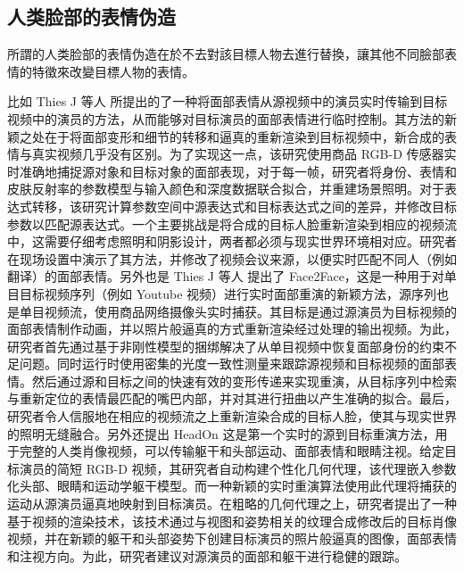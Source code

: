 \subsection{人类脸部的表情伪造}

所謂的人类脸部的表情伪造在於不去對該目標人物去進行替換，讓其他不同臉部表情的特徵來改變目標人物的表情。

比如 Thies J 等人 \cite{thies2015real} 所提出的了一种将面部表情从源视频中的演员实时传输到目标视频中的演员的方法，从而能够对目标演员的面部表情进行临时控制。其方法的新颖之处在于将面部变形和细节的转移和逼真的重新渲染到目标视频中，新合成的表情与真实视频几乎没有区别。为了实现这一点，该研究使用商品 RGB-D 传感器实时准确地捕捉源对象和目标对象的面部表现，对于每一帧，研究者将身份、表情和皮肤反射率的参数模型与输入颜色和深度数据联合拟合，并重建场景照明。对于表达式转移，该研究计算参数空间中源表达式和目标表达式之间的差异，并修改目标参数以匹配源表达式。一个主要挑战是将合成的目标人脸重新渲染到相应的视频流中，这需要仔细考虑照明和阴影设计，两者都必须与现实世界环境相对应。研究者在现场设置中演示了其方法，并修改了视频会议来源，以便实时匹配不同人（例如翻译）的面部表情。另外也是 Thies J 等人 \cite{thies2016face2face}提出了 Face2Face，这是一种用于对单目目标视频序列（例如 Youtube 视频）进行实时面部重演的新颖方法，源序列也是单目视频流，使用商品网络摄像头实时捕获。其目标是通过源演员为目标视频的面部表情制作动画，并以照片般逼真的方式重新渲染经过处理的输出视频。为此，研究者首先通过基于非刚性模型的捆绑解决了从单目视频中恢复面部身份的约束不足问题。同时运行时使用密集的光度一致性测量来跟踪源视频和目标视频的面部表情。然后通过源和目标之间的快速有效的变形传递来实现重演，从目标序列中检索与重新定位的表情最匹配的嘴巴内部，并对其进行扭曲以产生准确的拟合。最后，研究者令人信服地在相应的视频流之上重新渲染合成的目标人脸，使其与现实世界的照明无缝融合。另外还提出 HeadOn 这是第一个实时的源到目标重演方法，用于完整的人类肖像视频，可以传输躯干和头部运动、面部表情和眼睛注视。给定目标演员的简短 RGB-D 视频，其研究者自动构建个性化几何代理，该代理嵌入参数化头部、眼睛和运动学躯干模型。而一种新颖的实时重演算法使用此代理将捕获的运动从源演员逼真地映射到目标演员。在粗略的几何代理之上，研究者提出了一种基于视频的渲染技术，该技术通过与视图和姿势相关的纹理合成修改后的目标肖像视频，并在新颖的躯干和头部姿势下创建目标演员的照片般逼真的图像，面部表情和注视方向。为此，研究者建议对源演员的面部和躯干进行稳健的跟踪。

